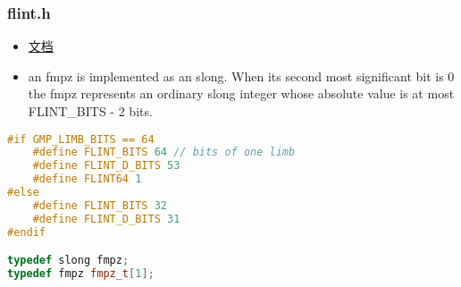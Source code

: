 
\begin{issues}
\issueDraft
\end{issues}


\subsubsection{flint.h}
\begin{itemize}
\item \href{http://flintlib.org/sphinx/fmpz.html}{文档}
\item an fmpz is implemented as an slong. When its second most significant bit is 0 the fmpz represents an ordinary slong integer whose absolute value is at most FLINT_BITS - 2 bits.
\end{itemize}
\begin{lstlisting}[language=cpp]
#if GMP_LIMB_BITS == 64
    #define FLINT_BITS 64 // bits of one limb
    #define FLINT_D_BITS 53
    #define FLINT64 1
#else 
    #define FLINT_BITS 32
    #define FLINT_D_BITS 31
#endif

typedef slong fmpz;
typedef fmpz fmpz_t[1];
\end{lstlisting}
